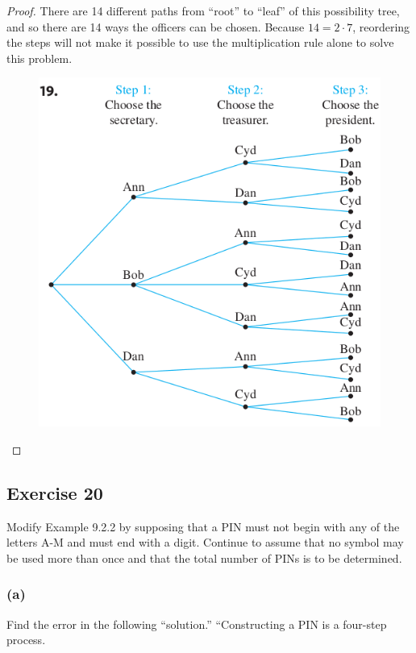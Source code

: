 \documentclass[14pt]{extarticle}
\begin{document}
\begin{proof}
     There are 14 different paths from “root” to “leaf” of this possibility tree, and so there are 14 ways the officers can
     be chosen. Because \(14 = 2\cdot7\), reordering the steps will not make it possible to use the multiplication rule
     alone to solve this problem.

     \begin{figure}[ht!]
          \centering
          \includegraphics[scale=0.45]{../images/9.2.19.png}
     \end{figure}
\end{proof}

\subsection{Exercise 20}
Modify Example 9.2.2 by supposing that a PIN must not begin with any of the letters A-M and must end with a digit. Continue to assume that no symbol may be used more than once and that the total number of PINs is to be determined.

\subsubsection{(a)}
Find the error in the following “solution.” “Constructing a PIN is a four-step process.
\end{document}
